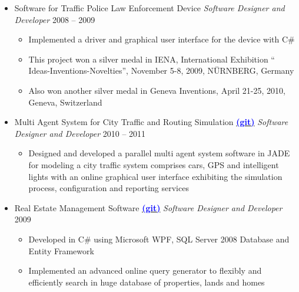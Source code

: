 \documentclass[letter]{res}
\begin{document}
\begin{resume}
\begin{itemize}[leftmargin=-.1in]
\item Software for Traffic Police Law Enforcement Device \newline
{\sl Software Designer and Developer} \hfill 2008 – 2009\\
   \vspace{-4mm}
   \iflong
      \begin{itemize}
        \item Implemented a driver and graphical user interface for the device with C\#
        \item This project won a silver medal in IENA, International Exhibition `` Ideas-Inventions-Novelties'', November 5-8, 2009, N\"{U}RNBERG, Germany
        \item Also won another silver medal in Geneva Inventions, April 21-25, 2010, Geneva, Switzerland
      \end{itemize}
   \fi
   
\item Multi Agent System for City Traffic and Routing Simulation {\href{https://github.com/omid55/city_routing_model_jade_mutli_agent_system}{\textbf{\textcolor{blue}{(git)}}}} \newline
{\sl Software Designer and Developer} \hfill 2010 – 2011\\
   \vspace{-4mm}
   \iflong
     \begin{itemize}
        \item Designed and developed a parallel multi agent system software in JADE for modeling a city traffic system comprises cars, GPS and intelligent lights with an online graphical user interface exhibiting the simulation process, configuration and reporting services
      \end{itemize}
	\fi
    
\item Real Estate Management Software {\href{https://github.com/omid55/real_state_manager}{\textbf{\textcolor{blue}{(git)}}}}
\newline
{\sl Software Designer and Developer} \hfill 2009\\
   \vspace{-4mm}
   \iflong
     \begin{itemize}
        \item Developed in C\# using Microsoft WPF, SQL Server 2008 Database and Entity Framework
        \item Implemented an advanced online query generator to flexibly and efficiently search in huge database of properties, lands and homes
     \end{itemize}
   \fi
   

\end{itemize}
\end{resume}
\end{document}
